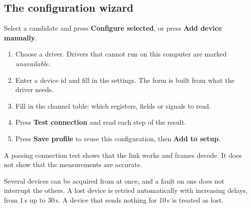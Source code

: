 \documentclass[11pt,a4paper]{article}
\newcommand{\ui}[1]{\textbf{#1}}
\begin{document}
\subsection{The configuration wizard}
Select a candidate and press \ui{Configure selected}, or press \ui{Add device manually}.
\begin{enumerate}
\item Choose a driver. Drivers that cannot run on this computer are marked \emph{unavailable}.
\item Enter a device id and fill in the settings. The form is built from what the driver needs.
\item Fill in the channel table: which registers, fields or signals to read.
\item Press \ui{Test connection} and read each step of the result.
\item Press \ui{Save profile} to reuse this configuration, then \ui{Add to setup}.
\end{enumerate}
A passing connection test shows that the link works and frames decode. It does not show that
the measurements are accurate.

Several devices can be acquired from at once, and a fault on one does not interrupt the others.
A lost device is retried automatically with increasing delays, from 1\,s up to 30\,s. A device that
sends nothing for 10\,s is treated as lost.
\end{document}
